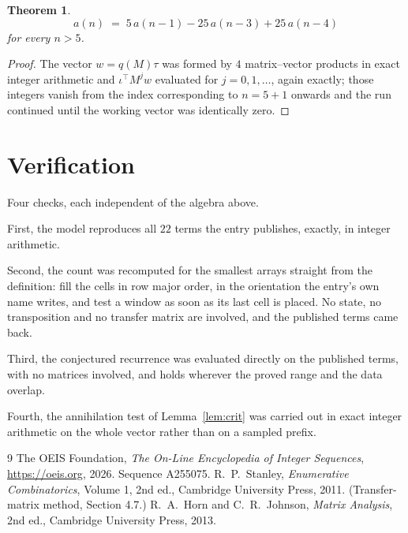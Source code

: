 \documentclass[11pt,a4paper]{article}
\theoremstyle{plain}
\newtheorem{theorem}{Theorem}
\theoremstyle{definition}
\begin{document}
\begin{theorem}
\[
a(n)\;=\;5\,a(n-1) - 25\,a(n-3) + 25\,a(n-4)
\]
for every $n>5$.
\end{theorem}

\begin{proof}
The vector $w=q(M)\tau$ was formed by $4$ matrix--vector products in exact integer
arithmetic and $\iota^{\!\top}M^{j}w$ evaluated for $j=0,1,\dots$, again exactly; those
integers vanish from the index corresponding to $n=5+1$ onwards and the run continued
until the working vector was identically zero.
\end{proof}

\section{Verification}

Four checks, each independent of the algebra above.

First, the model reproduces all $22$ terms the entry publishes, exactly, in integer
arithmetic.

Second, the count was recomputed for the smallest arrays straight from the definition: fill the
cells in row major order, in the orientation the entry's own name writes, and test a window as
soon as its last cell is placed. No state, no transposition and no transfer matrix are
involved, and the published terms came back.

Third, the conjectured recurrence was evaluated directly on the published terms, with no
matrices involved, and holds wherever the proved range and the data overlap.

Fourth, the annihilation test of Lemma~\ref{lem:crit} was carried out in exact integer
arithmetic on the whole vector rather than on a sampled prefix.

\begin{thebibliography}{9}
 The OEIS Foundation, \emph{The On-Line Encyclopedia of Integer
Sequences}, \url{https://oeis.org}, 2026. Sequence A255075.
 R.~P.~Stanley, \emph{Enumerative Combinatorics}, Volume 1, 2nd ed.,
Cambridge University Press, 2011. (Transfer-matrix method, Section 4.7.)
 R.~A.~Horn and C.~R.~Johnson, \emph{Matrix Analysis}, 2nd ed., Cambridge
University Press, 2013.
\end{thebibliography}
\end{document}
